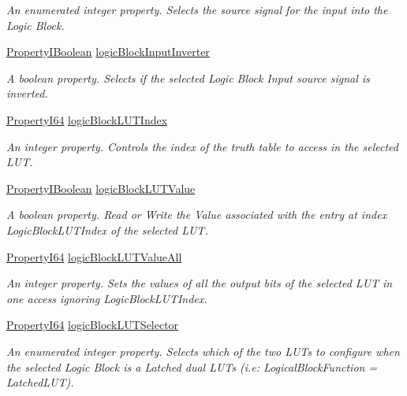 \begin{DoxyCompactItemize}
\begin{DoxyCompactList}\small\item\em An enumerated integer property. Selects the source signal for the input into the Logic Block. \end{DoxyCompactList}\item 
\hyperlink{group___common_interface_ga44f9437e24b21b6c93da9039ec6786aa}{Property\+I\+Boolean} \hyperlink{classmv_i_m_p_a_c_t_1_1acquire_1_1_gen_i_cam_1_1_logic_block_control_a251dfbb312a12faa9b8f628b97f46f45}{logic\+Block\+Input\+Inverter}
\begin{DoxyCompactList}\small\item\em A boolean property. Selects if the selected Logic Block Input source signal is inverted. \end{DoxyCompactList}\item 
\hyperlink{group___common_interface_ga81749b2696755513663492664a18a893}{Property\+I64} \hyperlink{classmv_i_m_p_a_c_t_1_1acquire_1_1_gen_i_cam_1_1_logic_block_control_aa2c324debca392820962c6094443d1eb}{logic\+Block\+L\+U\+T\+Index}
\begin{DoxyCompactList}\small\item\em An integer property. Controls the index of the truth table to access in the selected L\+U\+T. \end{DoxyCompactList}\item 
\hyperlink{group___common_interface_ga44f9437e24b21b6c93da9039ec6786aa}{Property\+I\+Boolean} \hyperlink{classmv_i_m_p_a_c_t_1_1acquire_1_1_gen_i_cam_1_1_logic_block_control_aa15ad3405272a9eef1d70be5d3594b93}{logic\+Block\+L\+U\+T\+Value}
\begin{DoxyCompactList}\small\item\em A boolean property. Read or Write the Value associated with the entry at index Logic\+Block\+L\+U\+T\+Index of the selected L\+U\+T. \end{DoxyCompactList}\item 
\hyperlink{group___common_interface_ga81749b2696755513663492664a18a893}{Property\+I64} \hyperlink{classmv_i_m_p_a_c_t_1_1acquire_1_1_gen_i_cam_1_1_logic_block_control_a79832d6cadbc750ef8c6a0293e2a30ba}{logic\+Block\+L\+U\+T\+Value\+All}
\begin{DoxyCompactList}\small\item\em An integer property. Sets the values of all the output bits of the selected L\+U\+T in one access ignoring Logic\+Block\+L\+U\+T\+Index. \end{DoxyCompactList}\item 
\hyperlink{group___common_interface_ga81749b2696755513663492664a18a893}{Property\+I64} \hyperlink{classmv_i_m_p_a_c_t_1_1acquire_1_1_gen_i_cam_1_1_logic_block_control_a21158971017be39ba75a86ac4ebe8d52}{logic\+Block\+L\+U\+T\+Selector}
\begin{DoxyCompactList}\small\item\em An enumerated integer property. Selects which of the two L\+U\+Ts to configure when the selected Logic Block is a Latched dual L\+U\+Ts (i.\+e\+: Logical\+Block\+Function = Latched\+L\+U\+T). \end{DoxyCompactList}\end{DoxyCompactItemize}


